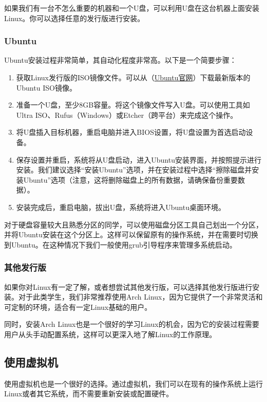 \documentclass[../main.tex]{subfiles}
\begin{document}
如果我们有一台不怎么重要的机器和一个U盘，可以利用U盘在这台机器上面安装Linux。你可以选择任意的发行版进行安装。

\subsubsection{Ubuntu}

Ubuntu安装过程非常简单，其自动化程度非常高。以下是一个简要步骤：

\begin{enumerate}
  \item 获取Linux发行版的ISO镜像文件。可以从（\href{https://ubuntu.com/download}{Ubuntu官网}）下载最新版本的Ubuntu ISO镜像。
  \item 准备一个U盘，至少8GB容量。将这个镜像文件写入U盘。可以使用工具如Ultra ISO、Rufus（Windows）或Etcher（跨平台）来完成这个操作。
  \item 将U盘插入目标机器，重启电脑并进入BIOS设置，将U盘设置为首选启动设备。
  \item 保存设置并重启，系统将从U盘启动，进入Ubuntu安装界面，并按照提示进行安装。我们建议选择“安装Ubuntu”选项，并在安装过程中选择“擦除磁盘并安装Ubuntu”选项（注意，这将删除磁盘上的所有数据，请确保备份重要数据）。
  \item 安装完成后，重启电脑，拔出U盘，系统将进入Ubuntu桌面环境。
\end{enumerate}

对于硬盘容量较大且熟悉分区的同学，可以使用磁盘分区工具自己划出一个分区，并将Ubuntu安装在这个分区上。这样可以保留原有的操作系统，并在需要时切换到Ubuntu。在这种情况下我们一般使用grub引导程序来管理多系统启动。

\subsubsection{其他发行版}

如果你对Linux有一定了解，或者想尝试其他发行版，可以选择其他发行版进行安装。对于此类学生，我们非常推荐使用Arch Linux，因为它提供了一个非常灵活和可定制的环境，适合有一定Linux基础的用户。

同时，安装Arch Linux也是一个很好的学习Linux的机会，因为它的安装过程需要用户从头手动配置系统，这样可以更深入地了解Linux的工作原理。

\subsection{使用虚拟机}

使用虚拟机也是一个很好的选择。通过虚拟机，我们可以在现有的操作系统上运行Linux或者其它系统，而不需要重新安装或配置硬件。
\end{document}
